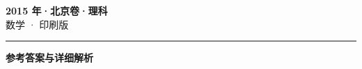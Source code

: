\documentclass[zihao=5, a4paper]{ctexart}
\begin{document}
\begin{center}
  {\Large\bfseries 2015 年·北京卷·理科}\\[4pt]
  {\large 数学 · 印刷版}
\end{center}
\medskip
{}

\par\bigskip\hrule\bigskip
{}
\begin{center}{\large\bfseries 参考答案与详细解析}\end{center}
\smallskip

\end{document}
